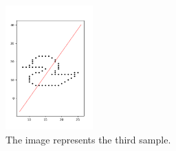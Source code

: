 \begin{centering}
  \begin{figure}[h]
      \centering
      \includegraphics[width=0.3\textwidth]{sample3.png}
      \caption{The image represents the third sample.}
      \label{fig:enter-label}
  \end{figure}
\end{centering}
